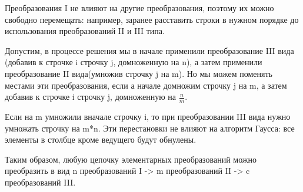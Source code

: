 \documentclass[a4paper]{article}
\begin{document}
Преобразования I не влияют на другие преобразования, поэтому их можно свободно перемещать: например, заранее расставить строки в нужном порядке до использования преобразований II и III типа.


Допустим, в процессе решения мы в начале применили преобразование III вида (добавив к строчке i строчку j, домноженную на n), а затем применили преобразование II вида(умножив строчку j на m).
Но мы можем поменять местами эти преобразования, если а начале домножим строчку j на m, а затем добавив к строчке i строчку j, домноженную на $\frac{n}{m}$.

Если на m умножили вначале строчку i, то при преобразовании III вида нужно умножать строчку на m*n.
Эти перестановки не влияют на алгоритм Гаусса: все элементы в столбце кроме ведущего будут обнулены.


Таким образом, любую цепочку элементарных преобразований можно преобразить в вид n преобразований I -> m преобразований II -> c преобразований III.
\end{document}
